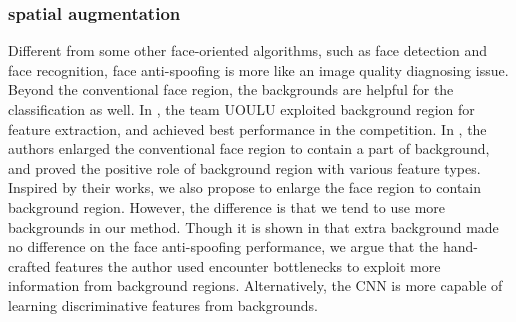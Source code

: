 \documentclass[letterpaper, 10 pt, conference]{ieeeconf}
\begin{document}
\subsubsection{spatial augmentation}

Different from some other face-oriented algorithms, such as face detection and face recognition, face anti-spoofing is more like an image quality diagnosing issue. Beyond the conventional face region, the backgrounds are helpful for the classification as well. In \cite{Face_Anti_Spoofing_Competition_2011}, the team UOULU exploited background region for feature extraction, and achieved best performance in the competition. In \cite{Face_Anti_Spoofing_JianweiYang_2013}, the authors enlarged the conventional face region to contain a part of background, and proved the positive role of background region with various feature types. Inspired by their works, we also propose to enlarge the face region to contain background region. However, the difference is that we tend to use more backgrounds in our method. Though it is shown in \cite{Face_Anti_Spoofing_JianweiYang_2013} that extra background made no difference on the face anti-spoofing performance, we argue that the hand-crafted features the author used encounter bottlenecks to exploit more information from background regions. Alternatively, the CNN is more capable of learning discriminative features from backgrounds.
\end{document}
